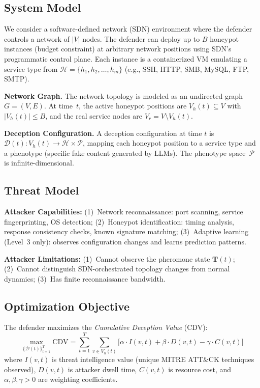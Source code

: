 \documentclass[review,3p,twocolumn]{elsarticle}
\newcommand{\calD}{\mathcal{D}}
\newcommand{\calH}{\mathcal{H}}
\newcommand{\Vh}{V_h}
\newcommand{\Vr}{V_r}
\newcommand{\Tmat}{\mathbf{T}}
\newcommand{\CDV}{\mathrm{CDV}}
\begin{document}
\subsection{System Model}

We consider a software-defined network (SDN) environment where the defender controls a network of $|V|$ nodes. The defender can deploy up to $B$ honeypot instances (budget constraint) at arbitrary network positions using SDN's programmatic control plane. Each instance is a containerized VM emulating a service type from $\calH = \{h_1, h_2, \ldots, h_m\}$ (e.g., SSH, HTTP, SMB, MySQL, FTP, SMTP).

\textbf{Network Graph.}  The network topology is modeled as an undirected graph $G = (V, E)$. At time~$t$, the active honeypot positions are $\Vh(t) \subseteq V$ with $|\Vh(t)| \leq B$, and the real service nodes are $\Vr = V \setminus \Vh(t)$.

\textbf{Deception Configuration.}  A deception configuration at time $t$ is $\calD(t): \Vh(t) \rightarrow \calH \times \mathcal{P}$, mapping each honeypot position to a service type and a phenotype (specific fake content generated by LLMs). The phenotype space~$\mathcal{P}$ is infinite-dimensional.

\subsection{Threat Model}

\textbf{Attacker Capabilities:}
(1)~Network reconnaissance: port scanning, service fingerprinting, OS detection;
(2)~Honeypot identification: timing analysis, response consistency checks, known signature matching;
(3)~Adaptive learning (Level~3 only): observes configuration changes and learns prediction patterns.

\textbf{Attacker Limitations:}
(1)~Cannot observe the pheromone state $\Tmat(t)$;
(2)~Cannot distinguish SDN-orchestrated topology changes from normal dynamics;
(3)~Has finite reconnaissance bandwidth.

\subsection{Optimization Objective}

The defender maximizes the \emph{Cumulative Deception Value} (CDV):
\begin{equation}
\label{eq:cdv}
\max_{\{\calD(t)\}_{t=1}^{T}} \CDV = \sum_{t=1}^{T} \sum_{v \in \Vh(t)} \bigl[ \alpha \cdot I(v,t) + \beta \cdot D(v,t) - \gamma \cdot C(v,t) \bigr]
\end{equation}
where $I(v,t)$ is threat intelligence value (unique MITRE ATT\&CK techniques observed), $D(v,t)$ is attacker dwell time, $C(v,t)$ is resource cost, and $\alpha, \beta, \gamma > 0$ are weighting coefficients.
\end{document}
